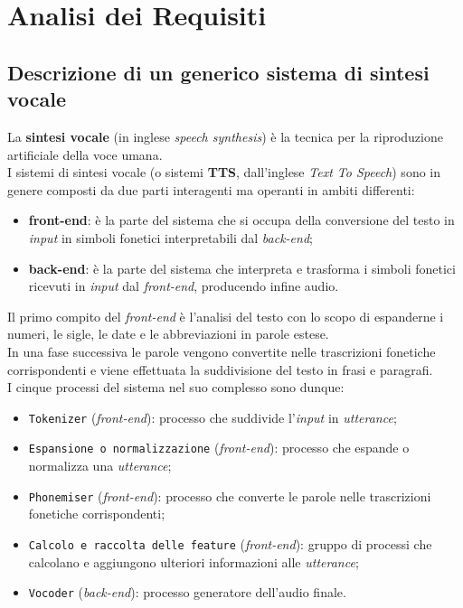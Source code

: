 
\chapter{Analisi dei Requisiti}
\label{cap:analisi-requisiti}


\section{Descrizione di un generico sistema di sintesi vocale}
La \textbf{sintesi vocale} (in inglese \textit{speech synthesis}) è la tecnica per la riproduzione
artificiale della voce umana.\\ I sistemi di sintesi vocale (o sistemi \textbf{TTS}, dall'inglese \textit{Text To Speech})
 sono in genere composti da due parti interagenti ma operanti in ambiti differenti:
\begin{itemize}
  \item \textbf{front-end}: è la parte del sistema che si occupa della conversione del testo in \textit{input} in simboli fonetici 
                            interpretabili dal \textit{back-end};
  \item \textbf{back-end}: è la parte del sistema che interpreta e trasforma i simboli fonetici ricevuti in \textit{input} 
                           dal \textit{front-end}, producendo infine audio.
\end{itemize}
Il primo compito del \textit{front-end} è l'analisi del testo con lo scopo di espanderne i numeri, le sigle,
le date e le abbreviazioni in parole estese. \\
In una fase successiva le parole vengono convertite nelle trascrizioni fonetiche corrispondenti e viene
effettuata la suddivisione del testo in frasi e paragrafi. \\
I cinque processi del sistema nel suo complesso sono dunque:
\begin{itemize}
  \item \texttt{Tokenizer} (\textit{front-end}): processo che suddivide l'\textit{input} in \textit{utterance};
  \item \texttt{Espansione o normalizzazione} (\textit{front-end}): processo che espande o normalizza una \textit{utterance};
  \item \texttt{Phonemiser} (\textit{front-end}): processo che converte le parole nelle trascrizioni fonetiche corrispondenti;
  \item \texttt{Calcolo e raccolta delle feature} (\textit{front-end}): gruppo di processi che calcolano e aggiungono ulteriori
               informazioni alle \textit{utterance};
  \item \texttt{Vocoder} (\textit{back-end}): processo generatore dell'audio finale.
\end{itemize}

